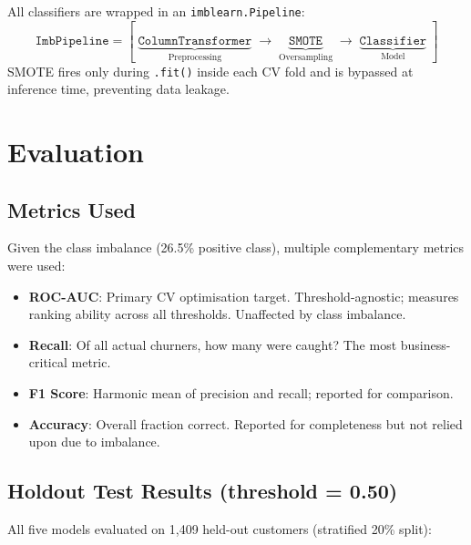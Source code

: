 \documentclass[12pt,a4paper]{article}
\begin{document}
All classifiers are wrapped in an \texttt{imblearn.Pipeline}:
\[
\texttt{ImbPipeline} = [\; \underbrace{\texttt{ColumnTransformer}}_{\text{Preprocessing}} \;\rightarrow\; \underbrace{\texttt{SMOTE}}_{\text{Oversampling}} \;\rightarrow\; \underbrace{\texttt{Classifier}}_{\text{Model}} \;]
\]
SMOTE fires only during \texttt{.fit()} inside each CV fold and is bypassed at inference time, preventing data leakage.

\section{Evaluation}

\subsection{Metrics Used}

Given the class imbalance (26.5\% positive class), multiple complementary metrics were used:

\begin{itemize}[leftmargin=2em]
    \item \textbf{ROC-AUC}: Primary CV optimisation target. Threshold-agnostic; measures ranking ability across all thresholds. Unaffected by class imbalance.
    \item \textbf{Recall}: Of all actual churners, how many were caught? The most business-critical metric.
    \item \textbf{F1 Score}: Harmonic mean of precision and recall; reported for comparison.
    \item \textbf{Accuracy}: Overall fraction correct. Reported for completeness but not relied upon due to imbalance.
\end{itemize}

\subsection{Holdout Test Results (threshold = 0.50)}

All five models evaluated on 1,409 held-out customers (stratified 20\% split):
\end{document}
